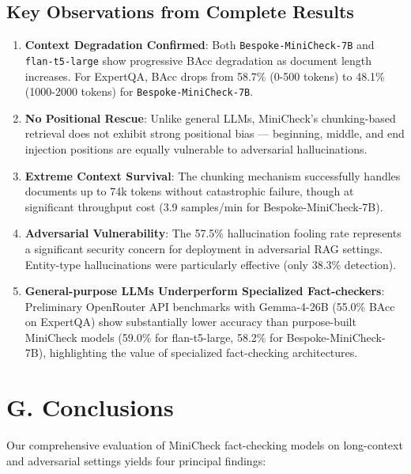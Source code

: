 \documentclass[12pt, letterpaper]{article}
\begin{document}
\subsection*{Key Observations from Complete Results}

\begin{enumerate}
    \item \textbf{Context Degradation Confirmed}: Both \texttt{Bespoke-MiniCheck-7B} and \texttt{flan-t5-large} show progressive BAcc degradation as document length increases. For ExpertQA, BAcc drops from 58.7\% (0-500 tokens) to 48.1\% (1000-2000 tokens) for \texttt{Bespoke-MiniCheck-7B}.

    \item \textbf{No Positional Rescue}: Unlike general LLMs, MiniCheck's chunking-based retrieval does not exhibit strong positional bias — beginning, middle, and end injection positions are equally vulnerable to adversarial hallucinations.

    \item \textbf{Extreme Context Survival}: The chunking mechanism successfully handles documents up to 74k tokens without catastrophic failure, though at significant throughput cost (3.9 samples/min for Bespoke-MiniCheck-7B).

    \item \textbf{Adversarial Vulnerability}: The 57.5\% hallucination fooling rate represents a significant security concern for deployment in adversarial RAG settings. Entity-type hallucinations were particularly effective (only 38.3\% detection).

    \item \textbf{General-purpose LLMs Underperform Specialized Fact-checkers}: Preliminary OpenRouter API benchmarks with Gemma-4-26B (55.0\% BAcc on ExpertQA) show substantially lower accuracy than purpose-built MiniCheck models (59.0\% for flan-t5-large, 58.2\% for Bespoke-MiniCheck-7B), highlighting the value of specialized fact-checking architectures.
\end{enumerate}

\section*{G. Conclusions}

Our comprehensive evaluation of MiniCheck fact-checking models on long-context and adversarial settings yields four principal findings:
\end{document}
